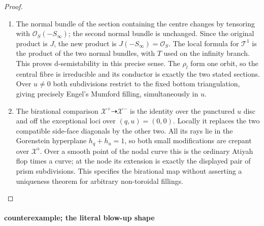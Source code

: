 \begin{proof}
\begin{enumerate}[label=\arabic*.,leftmargin=*]
\item The normal bundle of the section containing the centre changes
by tensoring with $\mathcal O_S(-S_\infty)$; the second normal
bundle is unchanged. Since the original product is $J$, the
new product is $J(-S_\infty)=\mathcal O_S$. The local
formula for $\mathcal T^1$ is the product of the two normal
bundles, with $T$ used on the infinity branch. This proves
d-semistability in this precise sense. The $\rho_l$ form one
orbit, so the central fibre is irreducible and its conductor is
exactly the two stated sections. Over $u\ne0$ both subdivisions
restrict to the fixed bottom triangulation, giving precisely
Engel's Mumford filling, simultaneously in $u$.

\item The birational comparison $\mathcal X^+\dashrightarrow
\mathcal X^-$ is the identity over the punctured $u$ disc and
off the exceptional loci over $(q,u)=(0,0)$. Locally it replaces
the two compatible side-face diagonals by the other two.
All its rays lie in the Gorenstein hyperplane $h_q+h_u=1$,
so both small modifications are crepant over
$\mathcal X^\flat$. Over a smooth point of the nodal curve
this is the ordinary Atiyah flop times a curve; at the node its
extension is exactly the displayed pair of prism subdivisions.
This specifies the birational map without asserting a uniqueness
theorem for arbitrary non-toroidal fillings.
\end{enumerate}
\end{proof}


\paragraph{counterexample; the literal blow-up shape}\label{push:src:A.2.3}\label{push:A23}

